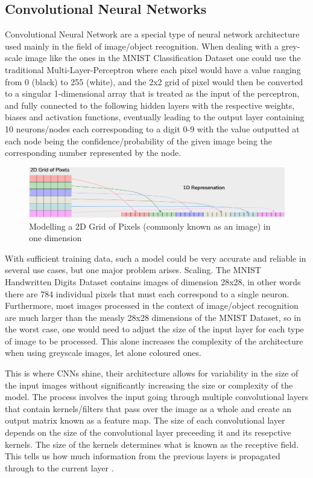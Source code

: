 \subsection{Convolutional Neural Networks}
Convolutional Neural Network are a special type of neural network architecture used mainly in the field of image/object recognition. When dealing with a grey-scale image like the ones in the MNIST Classification Dataset \cite{MNIST} one could use the traditional Multi-Layer-Perceptron \cite{Klein} where each pixel would have a value ranging from 0 (black) to 255 (white), and the 2x2 grid of pixel would then be converted to a singular 1-dimensional array that is treated as the input of the perceptron, and fully connected to the following hidden layers with the respective weights, biases and activation functions, eventually leading to the output layer containing 10 neurons/nodes each corresponding to a digit 0-9 with the value outputted at each node being the confidence/probability of the given image being the corresponding number represented by the node.
\begin{figure}[H]
    \centering
    \includegraphics[scale=0.45]{images/2Dto1D.png}
    \caption{Modelling a 2D Grid of Pixels (commonly known as an image) in one dimension}
    \label{2Dto1D}
\end{figure}


With sufficient training data, such a model could be very accurate and reliable in several use cases, but one major problem arises. Scaling. The MNIST Handwritten Digits Dataset contains images of dimension 28x28, in other words there are 784 individual pixels that must each correspond to a single neuron. Furthermore, most images processed in the context of image/object recognition are much larger than the measly 28x28 dimensions of the MNIST Dataset, so in the worst case, one would need to adjust the size of the input layer for each type of image to be processed. This alone increases the complexity of the architecture when using greyscale images, let alone coloured ones.

This is where CNNs shine, their architecture allows for variability in the size of the input images without significantly increasing the size or complexity of the model. The process involves the input going through multiple convolutional layers that contain kernels/filters that pass over the image as a whole and create an output matrix known as a feature map. The size of each convolutional layer depends on the size of the convolutional layer preceeding it and its resepctive kernels. The size of the kernels determines what is known as the receptive field. This tells us how much information from the previous layers is propagated through to the current layer \cite{lecun2015deep}.

